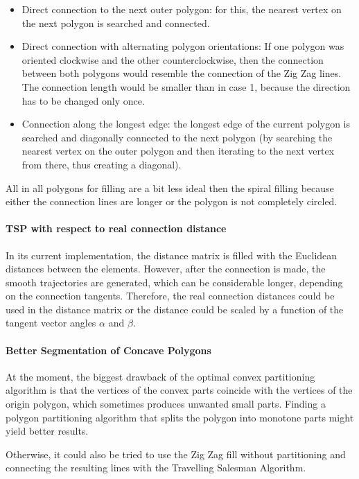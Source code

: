 \begin{itemize}
\item Direct connection to the next outer polygon: for this, the nearest vertex on the next polygon is searched and connected.
\item Direct connection with alternating polygon orientations: If one polygon was oriented clockwise and the other counterclockwise, then the connection between both polygons would resemble the connection of the Zig Zag lines. The connection length would be smaller than in case 1, because the direction has to be changed only once.
\item Connection along the longest edge: the longest edge of the current polygon is searched and diagonally connected to the next polygon (by searching the nearest vertex on the outer polygon and then iterating to the next vertex from there, thus creating a diagonal).

\end{itemize}
All in all polygons for filling are a bit less ideal then the spiral filling because either the connection lines are longer or the polygon is not completely circled.

\paragraph{TSP with respect to real connection distance}

In its current implementation, the distance matrix is filled with the Euclidean distances between the elements. However, after the connection is made, the smooth trajectories are generated, which can be considerable longer, depending on the connection tangents. Therefore, the real connection distances could be used in the distance matrix or the distance could be scaled by a function of the tangent vector angles $\alpha$ and $\beta$.

\paragraph{Better Segmentation of Concave Polygons}

At the moment, the biggest drawback of the optimal convex partitioning algorithm is that the vertices of the convex parts coincide with the vertices of the origin polygon, which sometimes produces unwanted small parts. Finding a polygon partitioning algorithm that splits the polygon into monotone parts might yield better results.

Otherwise, it could also be tried to use the Zig Zag fill without partitioning and connecting the resulting lines with the Travelling Salesman Algorithm.

